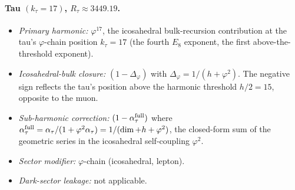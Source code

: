 ﻿\documentclass[reprint,amsmath,amssymb,aps,prd,longbibliography,floatfix]{revtex4-2}
\begin{document}
\paragraph{Tau $(k_\tau = 17)$, $R_\tau \approx 3449.19$.}
\begin{itemize}
\item \emph{Primary harmonic:} $\varphi^{17}$, the icosahedral
bulk-recursion contribution at the tau's $\varphi$-chain position
$k_\tau = 17$ (the fourth $E_8$ exponent, the first
above-the-threshold exponent).
\item \emph{Icosahedral-bulk closure:} $(1 - \Delta_\varphi)$ with
$\Delta_\varphi = 1/(h + \varphi^2)$. The negative sign reflects
the tau's position above the harmonic threshold $h/2 = 15$,
opposite to the muon.
\item \emph{Sub-harmonic correction:} $(1 - \alpha_\tau^{\rm full})$
where $\alpha_\tau^{\rm full} = \alpha_\tau/(1 + \varphi^2 \alpha_\tau)
= 1/(\dim + h + \varphi^2)$, the closed-form sum of the geometric
series in the icosahedral self-coupling $\varphi^2$.
\item \emph{Sector modifier:} $\varphi$-chain (icosahedral, lepton).
\item \emph{Dark-sector leakage:} not applicable.
\end{itemize}
\end{document}

